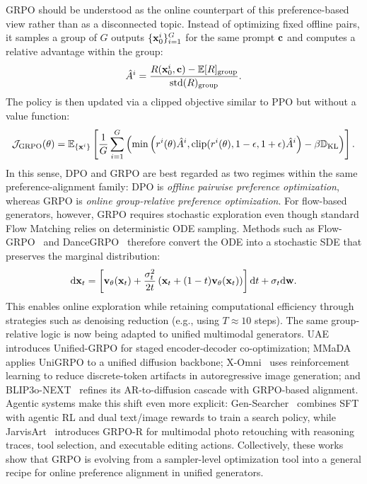 GRPO should be understood as the online counterpart of this preference-based view rather than as a disconnected topic. Instead of optimizing fixed offline pairs, it samples a group of $G$ outputs $\{\mathbf{x}_0^i\}_{i=1}^G$ for the same prompt $\mathbf{c}$ and computes a relative advantage within the group:
\begin{equation}
\hat{A}^i = \frac{R(\mathbf{x}^i_0, \mathbf{c}) - \mathbb{E}[R]_{\text{group}}}{\text{std}(R)_{\text{group}}}.
\end{equation}
The policy is then updated via a clipped objective similar to PPO but without a value function:
\begin{equation}
\mathcal{J}_{\text{GRPO}}(\theta) = \mathbb{E}_{\{\mathbf{x}^i\}} \left[ \frac{1}{G}\sum_{i=1}^{G} \left( \min \left( r^i(\theta) \hat{A}^i, \text{clip}(r^i(\theta), 1-\epsilon, 1+\epsilon)\hat{A}^i \right) - \beta \mathbb{D}_{\text{KL}} \right) \right].
\end{equation}
In this sense, DPO and GRPO are best regarded as two regimes within the same preference-alignment family: DPO is \emph{offline pairwise preference optimization}, whereas GRPO is \emph{online group-relative preference optimization}. For flow-based generators, however, GRPO requires stochastic exploration even though standard Flow Matching relies on deterministic ODE sampling. Methods such as Flow-GRPO~\citep{liu2025flow} and DanceGRPO~\citep{xue2025dancegrpo} therefore convert the ODE into a stochastic SDE that preserves the marginal distribution:
\begin{equation}
    \mathrm{d} \mathbf{x}_t = \left[\mathbf{v}_\theta(\mathbf{x}_t) + \frac{\sigma_t^2}{2t}\left(\mathbf{x}_t + (1-t)\mathbf{v}_\theta(\mathbf{x}_t)\right)\right] \mathrm{d} t + \sigma_t \mathrm{d} \mathbf{w}.
\end{equation}
This enables online exploration while retaining computational efficiency through strategies such as denoising reduction (e.g., using $T \approx 10$ steps). The same group-relative logic is now being adapted to unified multimodal generators. UAE~\citep{yan2025uae} introduces Unified-GRPO for staged encoder-decoder co-optimization; MMaDA~\citep{yang2025mmada} applies UniGRPO to a unified diffusion backbone; X-Omni~\citep{geng2025xomni} uses reinforcement learning to reduce discrete-token artifacts in autoregressive image generation; and BLIP3o-NEXT~\citep{chen2025blip3onext} refines its AR-to-diffusion cascade with GRPO-based alignment. Agentic systems make this shift even more explicit: Gen-Searcher~\citep{feng2026gen} combines SFT with agentic RL and dual text/image rewards to train a search policy, while JarvisArt~\citep{lin2025jarvisart} introduces GRPO-R for multimodal photo retouching with reasoning traces, tool selection, and executable editing actions. Collectively, these works show that GRPO is evolving from a sampler-level optimization tool into a general recipe for online preference alignment in unified generators.

